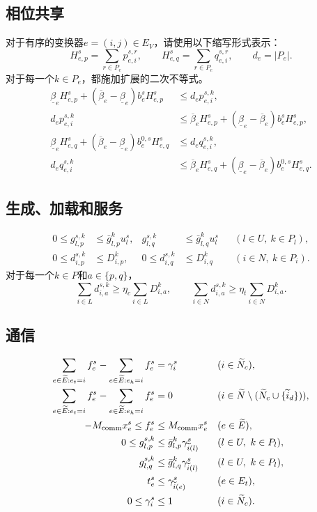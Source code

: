 \documentclass[11pt]{article}
\begin{document}
\subsection{相位共享}
对于有序的变换器$e=(i,j)\in E_V$，请使用以下缩写形式表示：
\[
H_{e,p}^s=\sum_{r\in P_e}p_{e,i}^{s,r},\qquad
H_{e,q}^s=\sum_{r\in P_e}q_{e,i}^{s,r},\qquad d_e=|P_e|.
\]
对于每一个$k\in P_e$，都施加扩展的二次不等式。
\begin{align*}
\underline\beta_e H_{e,p}^s+
 (\overline\beta_e-\underline\beta_e)b_e^sH_{e,p}^s
 &\leq d_e p_{e,i}^{s,k},\\
d_e p_{e,i}^{s,k}
 &\leq\overline\beta_e H_{e,p}^s+
 (\underline\beta_e-\overline\beta_e)b_e^sH_{e,p}^s,\\
\underline\beta_e H_{e,q}^s+
 (\overline\beta_e-\underline\beta_e)b_e^{0,s}H_{e,q}^s
 &\leq d_e q_{e,i}^{s,k},\\
d_e q_{e,i}^{s,k}
 &\leq\overline\beta_e H_{e,q}^s+
 (\underline\beta_e-\overline\beta_e)b_e^{0,s}H_{e,q}^s.
\end{align*}

\subsection{生成、加载和服务}
\begin{align*}
0\leq g_{l,p}^{s,k}&\leq\bar g_{l,p}^k u_l^s,&
g_{l,q}^{s,k}&\leq\bar g_{l,q}^k u_l^s
&& (l\in U,\ k\in P_l),\\
0\leq d_{i,p}^{s,k}&\leq D_{i,p}^k,&
0\leq d_{i,q}^{s,k}&\leq D_{i,q}^k
&& (i\in N,\ k\in P_i).
\end{align*}
对于每一个$k\in P$和$a\in\{p,q\}$，
\[
\sum_{i\in L}d_{i,a}^{s,k}\geq\eta_c\sum_{i\in L}D_{i,a}^k,
\qquad
\sum_{i\in N}d_{i,a}^{s,k}\geq\eta_t\sum_{i\in N}D_{i,a}^k.
\]

\subsection{通信}
\begin{align*}
\sum_{e\in\widetilde E:e_t=i}f_e^s-
\sum_{e\in\widetilde E:e_h=i}f_e^s
 &=\gamma_i^s &&(i\in\widetilde N_c),\\
\sum_{e\in\widetilde E:e_t=i}f_e^s-
\sum_{e\in\widetilde E:e_h=i}f_e^s
 &=0 &&(i\in\widetilde N\setminus(\widetilde N_c\cup\{\widetilde i_d\})),\\
-M_{\rm comm}x_e^s\leq f_e^s
 &\leq M_{\rm comm}x_e^s &&(e\in\widetilde E),\\
0\leq g_{l,p}^{s,k}
 &\leq\bar g_{l,p}^k\gamma_{\widetilde i(l)}^s
 &&(l\in U,\ k\in P_l),\\
g_{l,q}^{s,k}
 &\leq\bar g_{l,q}^k\gamma_{\widetilde i(l)}^s
 &&(l\in U,\ k\in P_l),\\
t_e^s&\leq\gamma_{\widetilde i(e)}^s &&(e\in E_t),\\
0\leq\gamma_i^s&\leq1 &&(i\in\widetilde N_c).
\end{align*}
\end{document}
